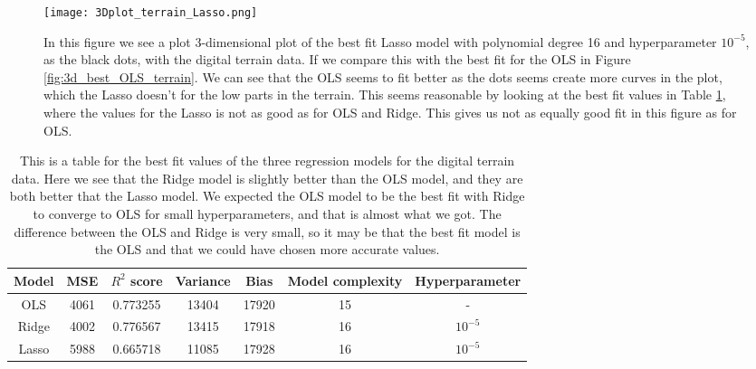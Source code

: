 \documentclass[12pt,a4paper,english]{article}
\begin{document}
\begin{figure}[htbp]
	\centering\texttt{[image: 3Dplot\_terrain\_Lasso.png]}
	\caption{In this figure we see a plot 3-dimensional plot of the best fit Lasso model with polynomial degree 16 and hyperparameter $10^{-5}$, as the black dots, with the digital terrain data. If we compare this with the best fit for the OLS in Figure \ref{fig:3d_best_OLS_terrain}. We can see that the OLS seems to fit better as the dots seems create more curves in the plot, which the Lasso doesn't for the low parts in the terrain. This seems reasonable by looking at the best fit values in Table \ref{tab:best_fit_values}, where the values for the Lasso is not as good as for OLS and Ridge. This gives us not as equally good fit in this figure as for OLS. \label{fig:3d_best_Lasso_terrain}}
\end{figure}

\begin{table}[h!]
	\centering
	\begin{tabular}{ |c|c|c|c|c|c|c| }
		\hline \rule{0pt}{13pt}
		Model& MSE & $R^2$ score & Variance & Bias & Model complexity & Hyperparameter\\
		\hline \rule{0pt}{13pt}
		OLS & 4061 & 0.773255 & 13404 & 17920 & 15 & - \\
		\hline \rule{0pt}{13pt}
		Ridge & 4002 & 0.776567 & 13415 & 17918 & 16 & $10^{-5}$ \\
		\hline \rule{0pt}{13pt}
		Lasso & 5988 & 0.665718 & 11085 & 17928 & 16 & $10^{-5}$ \\
		\hline
	\end{tabular}	
	\caption{This is a table for the best fit values of the three regression models for the digital terrain data. Here we see that the Ridge model is slightly better than the OLS model, and they are both better that the Lasso model. We expected the OLS model to be the best fit with Ridge to converge to OLS for small hyperparameters, and that is almost what we got. The difference between the OLS and Ridge is very small, so it may be that the best fit model is the OLS and that we could have chosen more accurate values.}
	\label{tab:best_fit_values}
\end{table}
\end{document}
